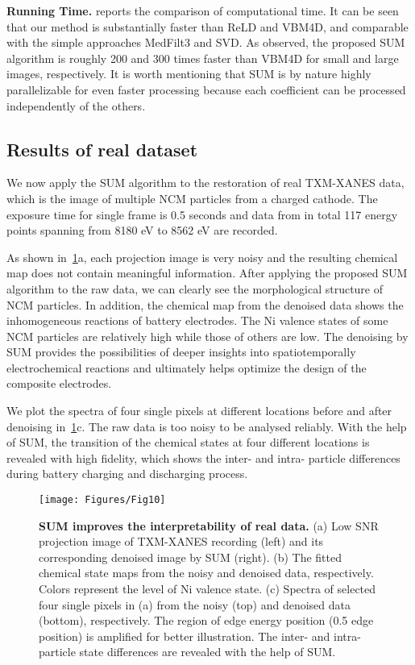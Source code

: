 \documentclass[10pt,twocolumn,letterpaper]{article}
\begin{document}
\textbf{Running Time.}  reports the comparison of computational time. It can be seen that our method is substantially faster than ReLD and VBM4D, and comparable with the simple approaches MedFilt3 and SVD. As observed, the proposed SUM algorithm is roughly 200 and 300 times faster than VBM4D for small and large images, respectively. It is worth mentioning that SUM is by nature highly parallelizable for even faster processing because each coefficient can be processed independently of the others.   





\subsection{Results of real dataset}

We now apply the SUM algorithm to the restoration of real TXM-XANES data, which is the image of multiple NCM particles from a charged cathode. The exposure time for single frame is 0.5 seconds and data from in total 117 energy points spanning from 8180 eV to 8562 eV are recorded.   

As shown in~\cref{fig10}a, each projection image is very noisy and the resulting chemical map does not contain meaningful information. After applying the proposed SUM algorithm to the raw data, we can clearly see the morphological structure of NCM particles. In addition, the chemical map from the denoised data shows the inhomogeneous reactions of battery electrodes. The Ni valence states of some NCM particles are relatively high while those of others are low. The denoising by SUM provides the possibilities of deeper insights into spatiotemporally electrochemical reactions and ultimately helps optimize the design of the composite electrodes.

We plot the spectra of four single pixels at different locations before and after denoising in~\cref{fig10}c. The raw data is too noisy to be analysed reliably. With the help of SUM, the transition of the chemical states at four different locations is revealed with high fidelity, which shows the inter- and intra- particle differences during battery charging and discharging process.     

\begin{figure}
  \centering
   
    \texttt{[image: Figures/Fig10]}
    \vspace{-10pt}
    \caption{\textbf{SUM improves the interpretability of real data.} (a) Low SNR projection image of TXM-XANES recording (left) and its corresponding denoised image by SUM (right). (b) The fitted chemical state maps from the noisy and denoised data, respectively. Colors represent the level of Ni valence state. (c) Spectra of selected four single pixels in (a) from the noisy (top) and denoised data (bottom), respectively. The region of edge energy position (0.5 edge position) is amplified for better illustration. The inter- and intra- particle state differences are revealed with the help of SUM.}
    \vspace{-15pt}
    \label{fig10}
\end{figure} 
\end{document}
